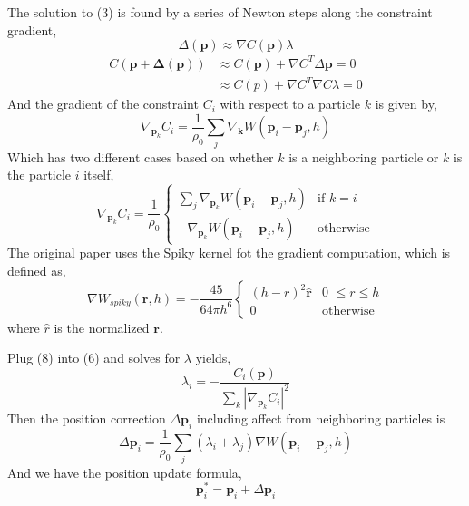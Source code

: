 \documentclass[sigconf]{acmart}
\newcommand{\vect}[1]{\boldsymbol{#1}}
\begin{document}
The solution to (3) is found by a series of Newton steps along the constraint gradient,
\begin{equation}
  \Delta(\vect{p}) \approx \nabla C(\vect{p})\lambda
\end{equation}
\begin{align*}
  C(\vect{p} + \vect{\Delta(\vect{p})}) &\approx C(\vect{p}) + \nabla C^T \Delta \vect{p} = 0 \tag*{(5)}\\
  &\approx C(p) + \nabla C^T \nabla C \lambda = 0 \tag*{(6)}
\end{align*}
And the gradient of the constraint $C_i$ with respect to a particle $k$ is given by,
\begin{equation}
  \nabla_{\vect{p}_k}C_i = \frac{1}{\rho_0}\sum_{j} \nabla_{\vect{k}}W(\vect{p}_i-\vect{p}_j, h) \tag*{(7)}
\end{equation}
Which has two different cases based on whether $k$ is a neighboring particle or $k$ is the particle $i$ itself,
\begin{equation*}
  \nabla_{\vect{p}_k}C_i = \frac{1}{\rho_0} 
  \begin{cases}
    \sum_{j} \nabla_{\vect{p}_k}W(\vect{p}_i-\vect{p}_j, h) &\text{if $k=i$}\\
    - \nabla_{\vect{p}_k}W(\vect{p}_i-\vect{p}_j, h) &\text{otherwise}
  \end{cases}
  \tag*{(8)}
\end{equation*}
The original paper uses the Spiky kernel fot the gradient computation, which is defined as,
\begin{equation*}
  \nabla W_{spiky}(\vect{r}, h) = -\frac{45}{64 \pi h^6}
  \begin{cases}
    (h - r)^2 \hat{\vect{r}} &\text{0 $\leq r \leq h$} \\
    0 &\text{otherwise}
  \end{cases}
\end{equation*}
where $\hat{r}$ is the normalized $\vect{r}$.

Plug (8) into (6) and solves for $\lambda$ yields,
\begin{equation}
  \lambda_i = -\frac{C_i(\vect{p})}{\sum_k |\nabla_{\vect{p}_k} C_i|^2} \tag*{(9)}
\end{equation}
Then the position correction $\Delta \vect{p}_i$ including affect from neighboring particles is
\begin{equation}
  \Delta \vect{p}_i = \frac{1}{\rho_0} \sum_j (\lambda_i + \lambda_j) \nabla W(\vect{p}_i - \vect{p}_j , h) \tag*{(12)}
\end{equation}
And we have the position update formula,
\begin{equation}
  \vect{p}_i^* = \vect{p}_i + \Delta \vect{p}_i \tag*{(13)}
\end{equation}
\end{document}
